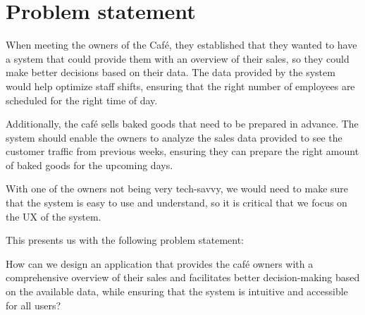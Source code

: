 \section{Problem statement}\label{sec:problem-statement}
When meeting the owners of the Caf\'e, they established that they wanted to have a system that could provide them with
an overview of their sales, so they could make better decisions based on their data.
The data provided by the system would help optimize staff shifts, ensuring that the right number of employees are
scheduled for the right time of day.

Additionally, the caf\'e sells baked goods that need to be prepared in advance.
The system should enable the owners to analyze the sales data provided to see the customer traffic from previous weeks,
ensuring they can prepare the right amount of baked goods for the upcoming days.

With one of the owners not being very tech-savvy, we would need to make sure that the system is easy to use and
understand, so it is critical that we focus on the UX of the system.

This presents us with the following problem statement:
\begin{tcolorbox}[title=Problem statement]
    How can we design an application that provides the caf\'e owners with a comprehensive overview of their sales and
    facilitates better decision-making based on the available data, while ensuring that the system is intuitive and
    accessible for all users?
\end{tcolorbox}

